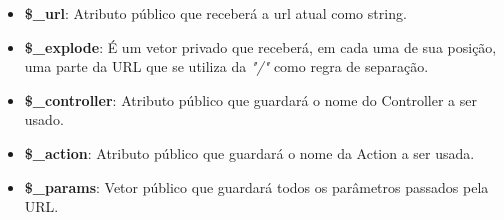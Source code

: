             \begin{itemize}
                \item\textbf{\$\_url}: Atributo público que receberá a url atual como string.
                \item\textbf{\$\_explode}: É um vetor privado que receberá, em cada uma de sua posição, uma parte da URL que se utiliza da \emph{"/"} como regra de separação.
                \item\textbf{\$\_controller}: Atributo público que guardará o nome do Controller a ser usado.
                \item\textbf{\$\_action}: Atributo público que guardará o nome da Action a ser usada.
                \item\textbf{\$\_params}: Vetor público que guardará todos os parâmetros passados pela URL.
            \end{itemize}

